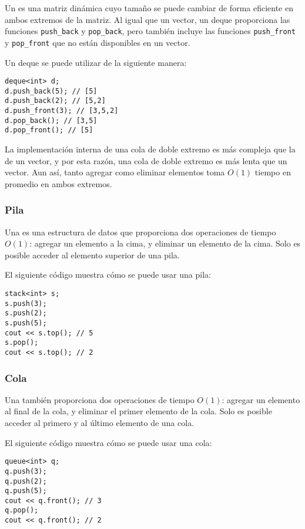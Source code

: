 
Un  es una matriz dinámica
cuyo tamaño se puede cambiar de forma eficiente
en ambos extremos de la matriz.
Al igual que un vector, un deque proporciona las funciones
\texttt{push\_back} y \texttt{pop\_back}, pero
también incluye las funciones
\texttt{push\_front} y \texttt{pop\_front}
que no están disponibles en un vector.

Un deque se puede utilizar de la siguiente manera:
\begin{lstlisting}
deque<int> d;
d.push_back(5); // [5]
d.push_back(2); // [5,2]
d.push_front(3); // [3,5,2]
d.pop_back(); // [3,5]
d.pop_front(); // [5]
\end{lstlisting}



La implementación interna de una cola de doble extremo
es más compleja que la de un vector,
y por esta razón, una cola de doble extremo es más lenta que un vector.
Aun así, tanto agregar como eliminar
elementos toma $O(1)$ tiempo en promedio en ambos extremos.

\subsubsection{Pila}


Una 
es una estructura de datos que proporciona dos
operaciones de tiempo $O(1)$:
agregar un elemento a la cima,
y eliminar un elemento de la cima.
Solo es posible acceder al elemento superior
de una pila.

El siguiente código muestra cómo se puede usar una pila:
\begin{lstlisting}
stack<int> s;
s.push(3);
s.push(2);
s.push(5);
cout << s.top(); // 5
s.pop();
cout << s.top(); // 2
\end{lstlisting}
\subsubsection{Cola}


Una  también
proporciona dos operaciones de tiempo $O(1)$:
agregar un elemento al final de la cola,
y eliminar el primer elemento de la cola.
Solo es posible acceder al primero
y al último elemento de una cola.

El siguiente código muestra cómo se puede usar una cola:
\begin{lstlisting}
queue<int> q;
q.push(3);
q.push(2);
q.push(5);
cout << q.front(); // 3
q.pop();
cout << q.front(); // 2
\end{lstlisting}

